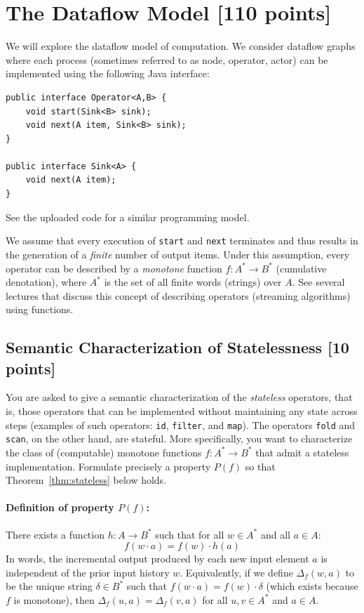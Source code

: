 \documentclass[11pt]{article}
\newcommand{\mnt}[1]{{\small\texttt{#1}}}
\theoremstyle{definition}
\newcommand{\kstar}{^{\textstyle *}}
\begin{document}
\clearpage %
\section{The Dataflow Model [110 points]}

We will explore the dataflow model of computation. We consider dataflow graphs where each process (sometimes referred to as node, operator, actor) can be implemented using the following Java interface:
\begin{verbatim}
public interface Operator<A,B> {
	void start(Sink<B> sink);
	void next(A item, Sink<B> sink);
}

public interface Sink<A> {
	void next(A item);
}
\end{verbatim}
See the uploaded code for a similar programming model.

We assume that every execution of \mnt{start} and \mnt{next} terminates and thus results in the generation of a \emph{finite} number of output items. Under this assumption, every operator can be described by a \emph{monotone} function $f: A\kstar \to B\kstar$ (cumulative denotation), where $A\kstar$ is the set of all finite words (strings) over $A$. See several lectures that discuss this concept of describing operators (streaming algorithms) using functions.

\subsection{Semantic Characterization of Statelessness [10 points]}

You are asked to give a semantic characterization of the \emph{stateless} operators, that is, those operators that can be implemented without maintaining any state across steps (examples of such operators: \mnt{id}, \mnt{filter}, and \mnt{map}). The operators \mnt{fold} and \mnt{scan}, on the other hand, are stateful. More specifically, you want to characterize the class of (computable) monotone functions $f: A\kstar \to B\kstar$ that admit a stateless implementation. Formulate precisely a property $P(f)$ so that Theorem~\ref{thm:stateless} below holds.

\paragraph{Definition of property $P(f)$:}
%
There exists a function $h: A \to B\kstar$ such that for all $w \in A\kstar$ and all $a \in A$:
\[
	f(w \cdot a) = f(w) \cdot h(a)
\]
In words, the incremental output produced by each new input element $a$ is independent of the prior input history $w$. Equivalently, if we define $\Delta_f(w, a)$ to be the unique string $\delta \in B\kstar$ such that $f(w \cdot a) = f(w) \cdot \delta$ (which exists because $f$ is monotone), then $\Delta_f(u, a) = \Delta_f(v, a)$ for all $u, v \in A\kstar$ and $a \in A$.
\end{document}
